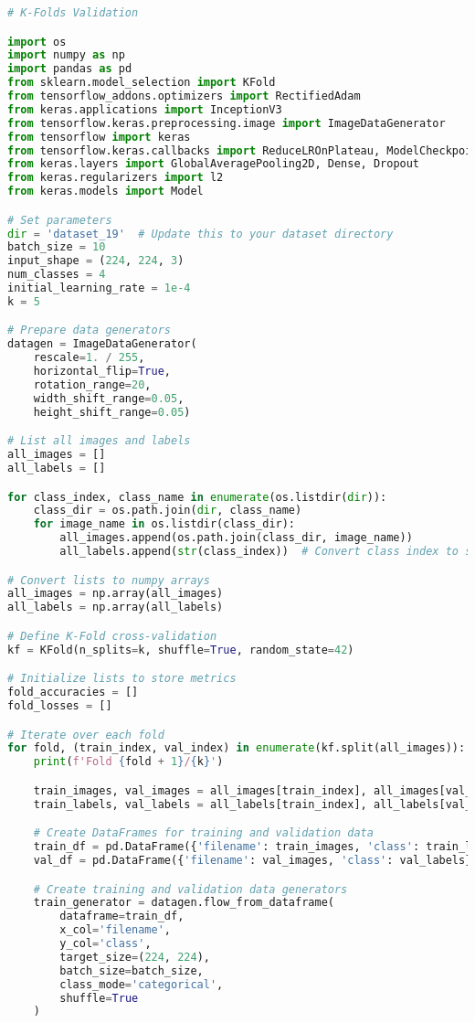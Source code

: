 \begin{lstlisting}[language=Python]
# K-Folds Validation

import os
import numpy as np
import pandas as pd
from sklearn.model_selection import KFold
from tensorflow_addons.optimizers import RectifiedAdam
from keras.applications import InceptionV3
from tensorflow.keras.preprocessing.image import ImageDataGenerator
from tensorflow import keras
from tensorflow.keras.callbacks import ReduceLROnPlateau, ModelCheckpoint, EarlyStopping
from keras.layers import GlobalAveragePooling2D, Dense, Dropout
from keras.regularizers import l2
from keras.models import Model

# Set parameters
dir = 'dataset_19'  # Update this to your dataset directory
batch_size = 10
input_shape = (224, 224, 3)
num_classes = 4
initial_learning_rate = 1e-4
k = 5

# Prepare data generators
datagen = ImageDataGenerator(
    rescale=1. / 255,
    horizontal_flip=True,
    rotation_range=20,
    width_shift_range=0.05,
    height_shift_range=0.05)

# List all images and labels
all_images = []
all_labels = []

for class_index, class_name in enumerate(os.listdir(dir)):
    class_dir = os.path.join(dir, class_name)
    for image_name in os.listdir(class_dir):
        all_images.append(os.path.join(class_dir, image_name))
        all_labels.append(str(class_index))  # Convert class index to string

# Convert lists to numpy arrays
all_images = np.array(all_images)
all_labels = np.array(all_labels)

# Define K-Fold cross-validation
kf = KFold(n_splits=k, shuffle=True, random_state=42)

# Initialize lists to store metrics
fold_accuracies = []
fold_losses = []

# Iterate over each fold
for fold, (train_index, val_index) in enumerate(kf.split(all_images)):
    print(f'Fold {fold + 1}/{k}')

    train_images, val_images = all_images[train_index], all_images[val_index]
    train_labels, val_labels = all_labels[train_index], all_labels[val_index]

    # Create DataFrames for training and validation data
    train_df = pd.DataFrame({'filename': train_images, 'class': train_labels})
    val_df = pd.DataFrame({'filename': val_images, 'class': val_labels})

    # Create training and validation data generators
    train_generator = datagen.flow_from_dataframe(
        dataframe=train_df,
        x_col='filename',
        y_col='class',
        target_size=(224, 224),
        batch_size=batch_size,
        class_mode='categorical',
        shuffle=True
    )


\end{lstlisting}
